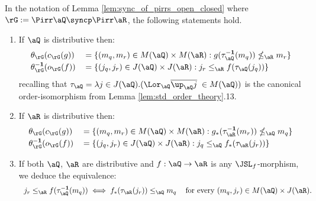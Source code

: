 \documentclass{article}
\begin{document}
\begin{corollary}
\label{cor:sync_of_pirrs_distrib}
In the notation of Lemma \ref{lem:sync_of_pirrs_open_closed} where $\rG := \Pirr\aQ \syncp \Pirr\aR$, the following statements hold.
\begin{enumerate}
\item
If $\aQ$ is distributive then:
\[
\begin{tabular}{lll}
$\theta_\rG(c_\rG(g))$
& $= \{ (m_q,m_r) \in M(\aQ) \times M(\aR) : g(\tau_\aQ^{\bf-1}(m_q)) \nleq_\aR m_r \}$
\\[0.5ex]
$\theta_\rG^{\bf-1}(o_\rG(f))$
& $= \{ (j_q,j_r) \in J(\aQ) \times J(\aR) : j_r \leq_\aR f(\tau_\aQ(j_q)) \}$
\end{tabular}
\]
recalling that $\tau_\aQ = \lambda j \in J(\aQ).(\Lor_\aQ \overline{\up_\aQ j} \; \in M(\aQ))$ is the canonical order-isomorphism from Lemma \ref{lem:std_order_theory}.13.

\item
If $\aR$ is distributive then:
\[
\begin{tabular}{lll}
$\theta_\rG(c_\rG(g))$
& $= \{ (m_q,m_r) \in M(\aQ) \times M(\aR) : g_*(\tau_\aR^{\bf-1}(m_r)) \nleq_\aQ m_q \}$
\\[0.5ex]
$\theta_\rG^{\bf-1}(o_\rG(f))$
& $= \{ (j_q,j_r) \in J(\aQ) \times J(\aR) : j_q \leq_\aQ f_*(\tau_\aR(j_r)) \}$
\end{tabular}
\]

\item
If both $\aQ$, $\aR$ are distributive and $f : \aQ \to \aR$ is any $\JSL_f$-morphism, we deduce the equivalence:
\[
\begin{tabular}{lll}
$j_r \leq_\aR f(\tau_\aQ^{\bf-1}(m_q)) \iff f_*(\tau_\aR(j_r)) \leq_\aQ m_q$
& for every $(m_q,j_r) \in M(\aQ) \times J(\aR)$.
\end{tabular}
\]

\end{enumerate}
\end{corollary}
\end{document}
